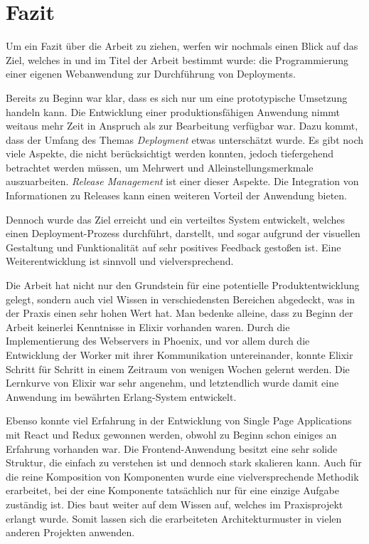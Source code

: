 \chapter{Fazit}

Um ein Fazit über die Arbeit zu ziehen, werfen wir nochmals einen Blick auf das Ziel, welches in  und im Titel der Arbeit bestimmt wurde: die Programmierung einer eigenen Webanwendung zur Durchführung von Deployments.

Bereits zu Beginn war klar, dass es sich nur um eine prototypische Umsetzung handeln kann. Die Entwicklung einer produktionsfähigen Anwendung nimmt weitaus mehr Zeit in Anspruch als zur Bearbeitung verfügbar war. Dazu kommt, dass der Umfang des Themas \emph{Deployment} etwas unterschätzt wurde. Es gibt noch viele Aspekte, die nicht berücksichtigt werden konnten, jedoch tiefergehend betrachtet werden müssen, um Mehrwert und Alleinstellungsmerkmale auszuarbeiten. \emph{Release Management} ist einer dieser Aspekte. Die Integration von Informationen zu Releases kann einen weiteren Vorteil der Anwendung bieten.

Dennoch wurde das Ziel erreicht und ein verteiltes System entwickelt, welches einen Deployment-Prozess durchführt, darstellt, und sogar aufgrund der visuellen Gestaltung und Funktionalität auf sehr positives Feedback gestoßen ist. Eine Weiterentwicklung ist sinnvoll und vielversprechend.

Die Arbeit hat nicht nur den Grundstein für eine potentielle Produktentwicklung gelegt, sondern auch viel Wissen in verschiedensten Bereichen abgedeckt, was in der Praxis einen sehr hohen Wert hat. Man bedenke alleine, dass zu Beginn der Arbeit keinerlei Kenntnisse in Elixir vorhanden waren. Durch die Implementierung des Webservers in Phoenix, und vor allem durch die Entwicklung der Worker mit ihrer Kommunikation untereinander, konnte Elixir Schritt für Schritt in einem Zeitraum von wenigen Wochen gelernt werden. Die Lernkurve von Elixir war sehr angenehm, und letztendlich wurde damit eine Anwendung im bewährten Erlang-System entwickelt.

Ebenso konnte viel Erfahrung in der Entwicklung von Single Page Applications mit React und Redux gewonnen werden, obwohl zu Beginn schon einiges an Erfahrung vorhanden war. Die Frontend-Anwendung besitzt eine sehr solide Struktur, die einfach zu verstehen ist und dennoch stark skalieren kann. Auch für die reine Komposition von Komponenten wurde eine vielversprechende Methodik erarbeitet, bei der eine Komponente tatsächlich nur für eine einzige Aufgabe zuständig ist. Dies baut weiter auf dem Wissen auf, welches im Praxisprojekt \citep{Maemecke2017} erlangt wurde. Somit lassen sich die erarbeiteten Architekturmuster in vielen anderen Projekten anwenden.


